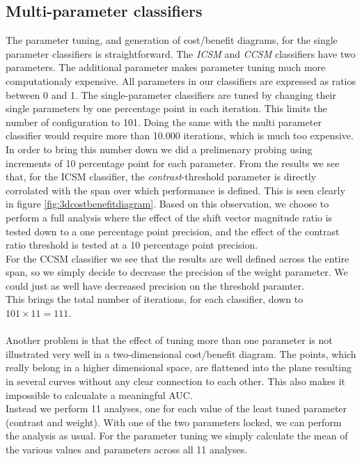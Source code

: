 \subsection{Multi-parameter classifiers}\label{sec:ph1multiparameter}
%
The parameter tuning, and generation of cost/benefit diagrams, for the single parameter classifiers is straightforward. The \textit{ICSM} and \textit{CCSM} classifiers have two parameters. The additional parameter makes parameter tuning much more computationaly expensive. All parameters in our classifiers are expressed as ratios between 0 and 1. The single-parameter classifiers are tuned by changing their single parameters by one percentage point in each iteration. This limits the number of configuration to 101. Doing the same with the multi parameter classifier would require more than 10.000 iterations, which is much too expensive.\\
In order to bring this number down we did a prelimenary probing using increments of 10 percentage point for each parameter. From the results we see that, for the ICSM classifier, the \textit{contrast}-threshold parameter is directly corrolated with the span over which performance is defined. This is seen clearly in figure \ref{fig:3dcostbenefitdiagram}. Based on this observation, we choose to perform a full analysis where the effect of the shift vector magnitude ratio is tested down to a one percentage point precision, and the effect of the contrast ratio threshold is tested at a 10 percentage point precision.\\
For the CCSM classifier we see that the results are well defined across the entire span, so we simply decide to decrease the precision of the weight parameter. We could just as well have decreased precision on the threshold paramter.\\
This brings the total number of iterations, for each classifier, down to $101 \times 11 = 111$.\\
\\
Another problem is that the effect of tuning more than one parameter is not illustrated very well in a two-dimensional cost/benefit diagram. The points, which really belong in a higher dimensional space, are flattened into the plane resulting in several curves without any clear connection to each other. This also makes it impossible to calcualate a meaningful AUC.\\
Instead we perform 11 analyses, one for each value of the least tuned parameter (contrast and weight). With one of the two parameters locked, we can perform the analysis as usual. For the parameter tuning we simply calculate the mean of the various values and parameters across all 11 analyses.\\
